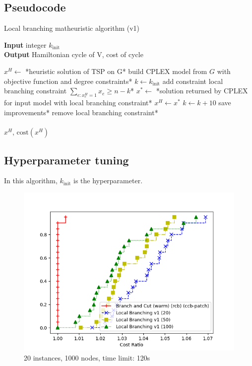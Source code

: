 \subsection{Pseudocode}
\begin{algorithm}[h]
    \caption{Local branching matheuristic algorithm (v1)}
    \textbf{Input} integer $k_{\text{init}}$\\
    \textbf{Output} Hamiltonian cycle of V, cost of cycle\\
    \begin{algorithmic}

        \State $x^H \gets$ *heuristic solution of TSP on G*
        \State *build CPLEX model from $G$ with objective function and degree constraints*
        \State $k\gets k_{\text{init}}$
        \State *add constraint local branching constraint $\sum_{e:x_e^H=1}x_e\geq n-k$*
        \State $x^*\gets$ *solution returned by CPLEX for input model with local branching constraint*
        \State $x^H\gets x^*$
        \EndIf
        \State $k\gets k+10$
        \EndIf
        \State *save improvements*
        \State *remove local branching constraint*
        \EndWhile\\\\

        \Return $x^H$, $\text{cost}(x^H)$

    \end{algorithmic}
\end{algorithm}
\FloatBarrier

\subsection{Hyperparameter tuning}

In this algorithm, $k_{\text{init}}$ is the hyperparameter.

\begin{figure}[h]
    \centering
    \includegraphics*[width=.6\textwidth]{../plots/perfprof_lbv1_costs.png}
    \caption*{20 instances, 1000 nodes, time limit: 120s}
\end{figure}

